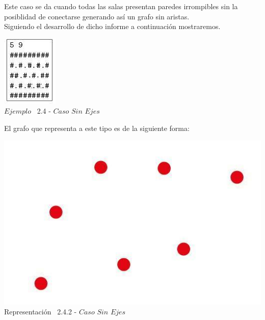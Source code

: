 Este caso se da cuando todas las salas presentan paredes irrompibles sin la posiblidad de conectarse generando as\'i un grafo sin aristas.\\

Siguiendo el desarrollo de dicho informe a continuaci\'on mostraremos.\\
 
\vspace*{0.3cm} \vspace*{0.3cm}
  \begin{center}
 \includegraphics[scale=1.4]{./EJ2/ej2sinejes.jpeg}
\\ {$Ejemplo$ \ 2.4 - $Caso$ $Sin$ $Ejes$}
  \end{center}
  \vspace*{0.3cm}

El grafo que representa a este tipo es de la siguiente forma:\\

\vspace*{0.3cm} \vspace*{0.3cm}
  \begin{center}
 \includegraphics[scale=0.5]{./EJ2/grafoSinEjes.jpeg}
 \\{Representación \ 2.4.2 - $Caso$ $Sin$ $Ejes$}
  \end{center}
  \vspace*{0.3cm}

